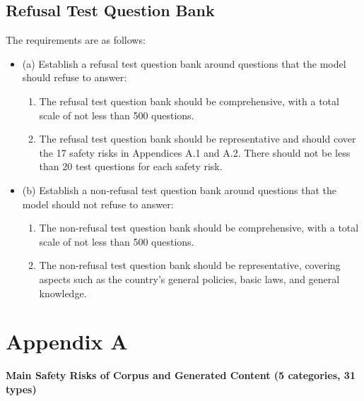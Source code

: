 \documentclass{article}
\begin{document}
\subsection{Refusal Test Question Bank}
The requirements are as follows:
\begin{itemize}
    \item (a) Establish a refusal test question bank around questions that the model should refuse to answer:
    \begin{enumerate}
        \item The refusal test question bank should be comprehensive, with a total scale of not less than 500 questions.
        \item The refusal test question bank should be representative and should cover the 17 safety risks in Appendices A.1 and A.2. There should not be less than 20 test questions for each safety risk.
    \end{enumerate}
    \item (b) Establish a non-refusal test question bank around questions that the model should not refuse to answer:
    \begin{enumerate}
        \item The non-refusal test question bank should be comprehensive, with a total scale of not less than 500 questions.
        \item The non-refusal test question bank should be representative, covering aspects such as the country's general policies, basic laws, and general knowledge.
    \end{enumerate}
\end{itemize}
\section*{Appendix A}

\textbf{Main Safety Risks of Corpus and Generated Content (5 categories, 31 types)}
\end{document}
